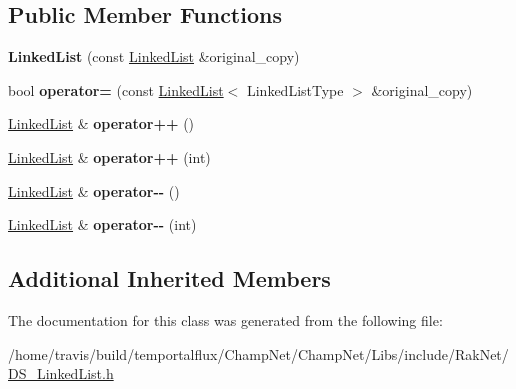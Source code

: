 \subsection*{Public Member Functions}
\begin{DoxyCompactItemize}
\item 
\hypertarget{class_data_structures_1_1_linked_list_a13ff0178ce3e28b3dba395ee037b73c3}{{\bfseries Linked\-List} (const \hyperlink{class_data_structures_1_1_linked_list}{Linked\-List} \&original\-\_\-copy)}\label{class_data_structures_1_1_linked_list_a13ff0178ce3e28b3dba395ee037b73c3}

\item 
\hypertarget{class_data_structures_1_1_linked_list_a76ad4f7f580c1e80510daeffa2833ac1}{bool {\bfseries operator=} (const \hyperlink{class_data_structures_1_1_linked_list}{Linked\-List}$<$ Linked\-List\-Type $>$ \&original\-\_\-copy)}\label{class_data_structures_1_1_linked_list_a76ad4f7f580c1e80510daeffa2833ac1}

\item 
\hypertarget{class_data_structures_1_1_linked_list_a1ea8adf310c0d9e00bf01a3a9e2b108f}{\hyperlink{class_data_structures_1_1_linked_list}{Linked\-List} \& {\bfseries operator++} ()}\label{class_data_structures_1_1_linked_list_a1ea8adf310c0d9e00bf01a3a9e2b108f}

\item 
\hypertarget{class_data_structures_1_1_linked_list_a8e3b8a409dd60fcd5186c318a2bbe7bb}{\hyperlink{class_data_structures_1_1_linked_list}{Linked\-List} \& {\bfseries operator++} (int)}\label{class_data_structures_1_1_linked_list_a8e3b8a409dd60fcd5186c318a2bbe7bb}

\item 
\hypertarget{class_data_structures_1_1_linked_list_ae9d8ab9240af7330758646bc36501713}{\hyperlink{class_data_structures_1_1_linked_list}{Linked\-List} \& {\bfseries operator-\/-\/} ()}\label{class_data_structures_1_1_linked_list_ae9d8ab9240af7330758646bc36501713}

\item 
\hypertarget{class_data_structures_1_1_linked_list_a54b8316457d87df178baa97a0a8d0746}{\hyperlink{class_data_structures_1_1_linked_list}{Linked\-List} \& {\bfseries operator-\/-\/} (int)}\label{class_data_structures_1_1_linked_list_a54b8316457d87df178baa97a0a8d0746}

\end{DoxyCompactItemize}
\subsection*{Additional Inherited Members}


The documentation for this class was generated from the following file\-:\begin{DoxyCompactItemize}
\item 
/home/travis/build/temportalflux/\-Champ\-Net/\-Champ\-Net/\-Libs/include/\-Rak\-Net/\hyperlink{_d_s___linked_list_8h}{D\-S\-\_\-\-Linked\-List.\-h}\end{DoxyCompactItemize}
